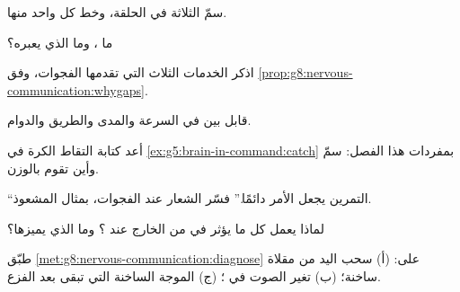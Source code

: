 \begin{exercise}[$\star$]\label{exo:g8:nervous-communication:3}
سمّ   الثلاثة في الحلقة، وخط كل واحد
منها.
\end{exercise}

\begin{exercise}[$\star$]\label{exo:g8:nervous-communication:4}
ما ، وما الذي يعبره؟
\end{exercise}

\begin{exercise}[$\star$]\label{exo:g8:nervous-communication:5}
اذكر الخدمات الثلاث التي تقدمها الفجوات، وفق
\cref{prop:g8:nervous-communication:whygaps}.
\end{exercise}

\begin{exercise}[$\star$]\label{exo:g8:nervous-communication:6}
قابل بين   في السرعة والمدى والطريق
والدوام.
\end{exercise}

\begin{exercise}[$\star\star$]\label{exo:g8:nervous-communication:7}
أعد كتابة التقاط الكرة في
\cref{ex:g5:brain-in-command:catch} بمفردات هذا الفصل:
سمّ   وأين تقوم  بالوزن.
\end{exercise}

\begin{exercise}[$\star\star$]\label{exo:g8:nervous-communication:8}
``التمرين يجعل الأمر دائمًا.'' فسّر الشعار عند الفجوات،
بمثال المشعوذ.
\end{exercise}

\begin{exercise}[$\star\star$]\label{exo:g8:nervous-communication:9}
لماذا يعمل كل ما يؤثر في  من الخارج عند
؟ وما الذي يميزها؟
\end{exercise}

\begin{exercise}[$\star\star$]\label{exo:g8:nervous-communication:10}
طبّق \cref{met:g8:nervous-communication:diagnose} على:
(أ) سحب اليد من مقلاة ساخنة؛ (ب) تغير الصوت في ؛
(ج) الموجة الساخنة التي تبقى بعد الفزع.
\end{exercise}

